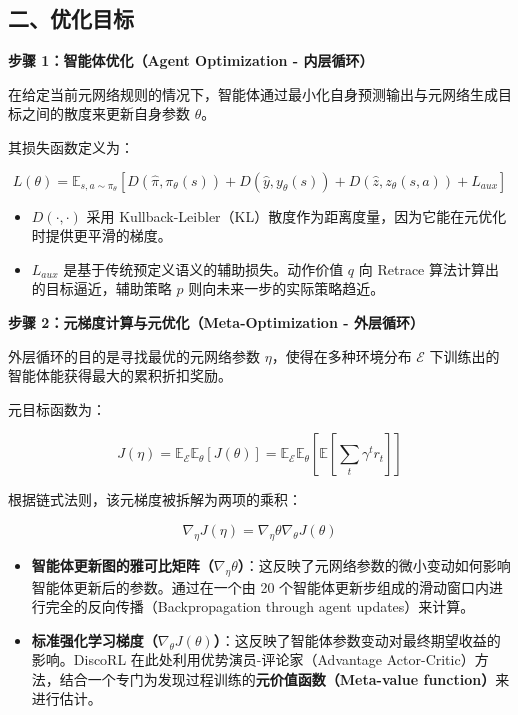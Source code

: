 \hypertarget{ux4e8cux4f18ux5316ux76eeux6807}{%
\subsection{二、优化目标}\label{ux4e8cux4f18ux5316ux76eeux6807}}

\textbf{步骤 1：智能体优化（Agent Optimization - 内层循环）}

在给定当前元网络规则的情况下，智能体通过最小化自身预测输出与元网络生成目标之间的散度来更新自身参数 \(\theta\)。

其损失函数定义为：

\[
L(\theta) = \mathbb{E}_{s,a \sim \pi_\theta}
\left[
D(\hat{\pi}, \pi_\theta(s)) + D(\hat{y}, y_\theta(s)) + D(\hat{z}, z_\theta(s,a)) + L_{aux}
\right]
\]

\begin{itemize}
\tightlist
\item
  \(D(\cdot,\cdot)\) 采用 Kullback-Leibler（KL）散度作为距离度量，因为它能在元优化时提供更平滑的梯度。
\item
  \(L_{aux}\) 是基于传统预定义语义的辅助损失。动作价值 \(q\) 向 Retrace 算法计算出的目标逼近，辅助策略 \(p\) 则向未来一步的实际策略趋近。
\end{itemize}

\textbf{步骤 2：元梯度计算与元优化（Meta-Optimization - 外层循环）}

外层循环的目的是寻找最优的元网络参数 \(\eta\)，使得在多种环境分布 \(\mathcal{E}\) 下训练出的智能体能获得最大的累积折扣奖励。

元目标函数为：

\[
J(\eta)
= \mathbb{E}_{\mathcal{E}}\mathbb{E}_{\theta}[J(\theta)]
= \mathbb{E}_{\mathcal{E}}\mathbb{E}_{\theta}
\left[
\mathbb{E}\left[\sum_t \gamma^t r_t\right]
\right]
\]

根据链式法则，该元梯度被拆解为两项的乘积：

\[
\nabla_\eta J(\eta) = \nabla_\eta \theta \nabla_\theta J(\theta)
\]

\begin{itemize}
\tightlist
\item
  \textbf{智能体更新图的雅可比矩阵（\(\nabla_\eta \theta\)）}：这反映了元网络参数的微小变动如何影响智能体更新后的参数。通过在一个由 20 个智能体更新步组成的滑动窗口内进行完全的反向传播（Backpropagation through agent updates）来计算。
\item
  \textbf{标准强化学习梯度（\(\nabla_\theta J(\theta)\)）}：这反映了智能体参数变动对最终期望收益的影响。DiscoRL 在此处利用优势演员-评论家（Advantage Actor-Critic）方法，结合一个专门为发现过程训练的\textbf{元价值函数（Meta-value function）}来进行估计。
\end{itemize}

